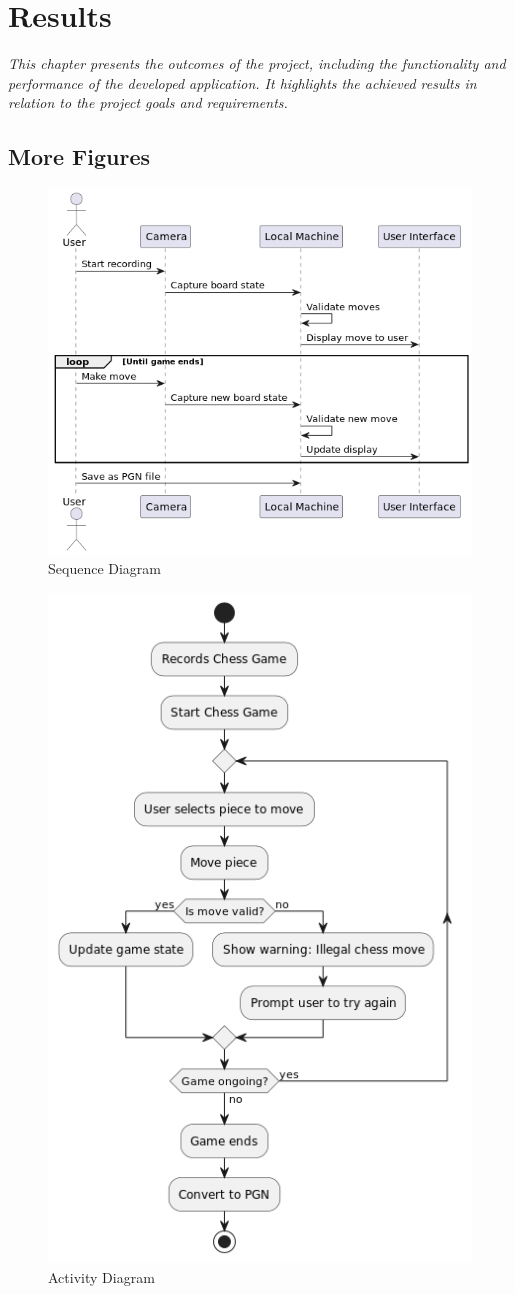 \chapter{Results}

\begin{center}
    \textit{This chapter presents the outcomes of the project, including the functionality and performance of the developed application. It highlights the achieved results in relation to the project goals and requirements.}
\end{center}

\section{More Figures}

\begin{figure}
    \centering
    \includegraphics[width=0.75\linewidth]{figures//uml/sequence.png}
    \caption{Sequence Diagram}
    \label{fig:sequence}
\end{figure}

\begin{figure}
    \centering
    \includegraphics[width=0.75\linewidth]{figures//uml/activity.png}
    \caption{Activity Diagram}
    \label{fig:activity}
\end{figure}